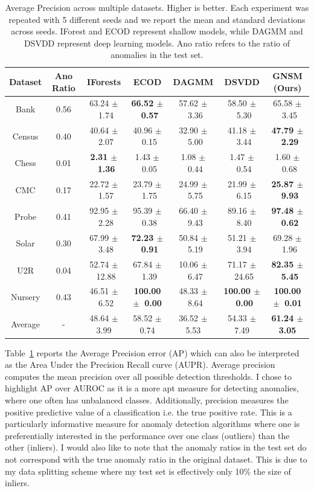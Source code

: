 \begin{table}[!ht]
    \centering
    \hspace*{-0.8cm}\begin{tabular}{c|c|ccccc}
    Dataset & Ano Ratio & IForests       & ECOD           & DAGMM          & DSVDD          & GNSM (Ours) \\
    \midrule
    Bank   & 0.56 & 63.24 $\pm$~1.74 & \textbf{66.52 $\pm$~0.57} & 57.62 $\pm$~3.36 & 58.50 $\pm$~5.30 & 65.58 $\pm$~3.45 \\
    Census  & 0.40 & 40.64 $\pm$~2.07 & 40.96 $\pm$~0.15 & 32.90 $\pm$~5.00 & 41.18 $\pm$~3.44 & \textbf{47.79 $\pm$~2.29} \\
    Chess   & 0.01 & \textbf{2.31 $\pm$~1.36} & 1.43 $\pm$~0.05 & 1.08 $\pm$~0.44 & 1.47 $\pm$~0.54 & 1.60 $\pm$~0.68  \\
    CMC      & 0.17 & 22.72 $\pm$~1.57 & 23.79 $\pm$~1.75 & 24.99 $\pm$~5.75 & 21.99 $\pm$~6.15 & \textbf{25.87 $\pm$~9.93} \\
    Probe    & 0.41 & 92.95 $\pm$~2.28 & 95.39 $\pm$~0.38 & 66.40 $\pm$~9.43 & 89.16 $\pm$~8.40 & \textbf{97.48 $\pm$~0.62} \\
    Solar   & 0.30 & 67.99 $\pm$~3.48 & \textbf{72.23 $\pm$~0.91} & 50.84 $\pm$~5.19 & 51.21 $\pm$~3.94 & 69.28 $\pm$~1.96 \\
    U2R     & 0.04 & 52.74 $\pm$~12.88 & 67.84 $\pm$~1.39 & 10.06 $\pm$~6.47 & 71.17 $\pm$~24.65 & \textbf{82.35 $\pm$~5.45} \\
    Nursery & 0.43 & 46.51 $\pm$~6.52 & \textbf{100.00 $\pm$~0.00} & 48.33 $\pm$~8.64 & \textbf{100.00 $\pm$~0.00} & \textbf{100.00 $\pm$~0.01} \\
    \midrule
Average & - & 48.64 $\pm$ 3.99 & 58.52 $\pm$ 0.74 & 36.52 $\pm$ 5.53 & 54.33 $\pm$ 7.49 & \textbf{61.24 $\pm$ 3.05}
    \end{tabular}
    \caption{Average Precision across multiple datasets. Higher is better. Each experiment was repeated with 5 different seeds and we report the mean and standard deviations across seeds. IForest and ECOD represent shallow models, while DAGMM and DSVDD represent deep learning models. Ano ratio refers to the ratio of anomalies in the test set.}
    \label{tabular_results}
\end{table}

Table~\ref{tabular_results} reports the Average Precision error (AP) which can also be interpreted as the Area Under the Precision Recall curve (AUPR).  Average precision computes the mean precision over all possible detection thresholds. I chose to highlight AP over AUROC as it is a more apt measure for detecting anomalies, where one often has unbalanced classes. Additionally, precision measures the positive predictive value of a classification i.e. the true positive rate. This is a particularly informative measure for anomaly detection algorithms where one is preferentially interested in the performance over one class (outliers) than the other (inliers). I would also like to note that the anomaly ratios in the test set do not correspond with the true anomaly ratio in the original dataset. This is due to my data splitting scheme where my test set is effectively only 10\% the size of inliers.

